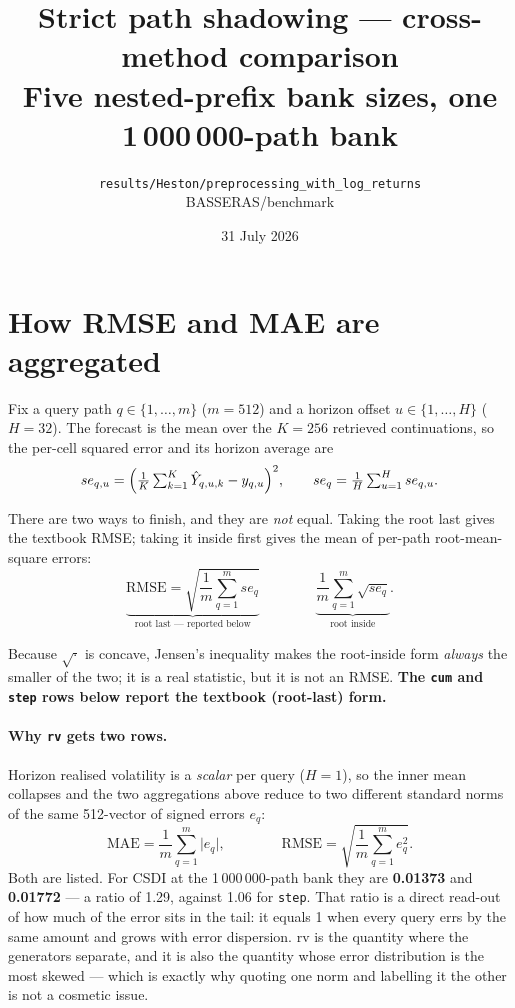 \documentclass[11pt,a4paper]{article}
\title{\textbf{Strict path shadowing --- cross-method comparison}\\[0.3em]
\large Five nested-prefix bank sizes, one 1\,000\,000-path bank}
\author{\texttt{results/Heston/preprocessing\_with\_log\_returns}\\
BASSERAS/benchmark}
\date{31 July 2026}
\begin{document}
\maketitle
\thispagestyle{empty}


\section*{How RMSE and MAE are aggregated}

Fix a query path $q\in\{1,\dots,m\}$ ($m=512$) and a horizon offset
$u\in\{1,\dots,H\}$ ($H=32$). The forecast is the mean over the $K=256$ retrieved
continuations, so the per-cell squared error and its horizon average are
%
\[
se_{q,u}=\Bigl(\tfrac{1}{K}\textstyle\sum_{k=1}^{K}\hat Y_{q,u,k}-y_{q,u}\Bigr)^{2},
\qquad
se_{q}=\frac{1}{H}\sum_{u=1}^{H}se_{q,u}.
\]

There are two ways to finish, and they are \emph{not} equal. Taking the root last
gives the textbook RMSE; taking it inside first gives the mean of per-path
root-mean-square errors:
%
\[
\underbrace{\text{RMSE}=\sqrt{\frac{1}{m}\sum_{q=1}^{m}se_{q}}}_{\text{root last --- reported below}}
\qquad\qquad
\underbrace{\frac{1}{m}\sum_{q=1}^{m}\sqrt{se_{q}}}_{\text{root inside}} .
\]

Because $\sqrt{\cdot}$ is concave, Jensen's inequality makes the root-inside form
\emph{always} the smaller of the two; it is a real statistic, but it is not an
RMSE. \textbf{The \texttt{cum} and \texttt{step} rows below report the textbook
(root-last) form.}

\paragraph{Why \texttt{rv} gets two rows.} Horizon realised volatility is a
\emph{scalar} per query ($H=1$), so the inner mean collapses and the two
aggregations above reduce to two different standard norms of the same
512-vector of signed errors $e_q$:
%
\[
\text{MAE}=\frac{1}{m}\sum_{q=1}^{m}\lvert e_q\rvert,
\qquad\qquad
\text{RMSE}=\sqrt{\frac{1}{m}\sum_{q=1}^{m}e_q^{2}} .
\]
%
Both are listed. For CSDI at the 1\,000\,000-path bank they are
\textbf{0.01373} and \textbf{0.01772} --- a ratio of
1.29, against 1.06 for \texttt{step}. That ratio is a
direct read-out of how much of the error sits in the tail: it equals 1 when
every query errs by the same amount and grows with error dispersion. rv is the
quantity where the generators separate, and it is also the quantity whose error
distribution is the most skewed --- which is exactly why quoting one norm and
labelling it the other is not a cosmetic issue.
\end{document}
